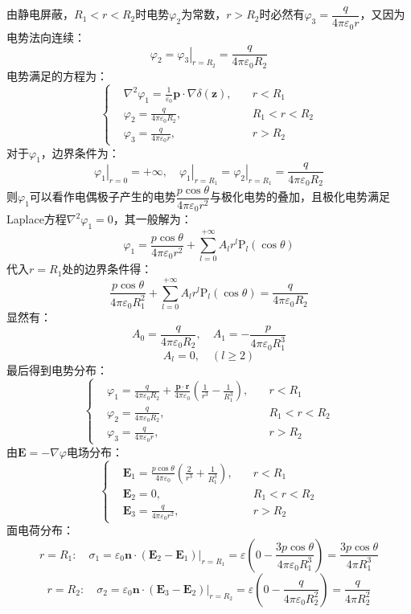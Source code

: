 \documentclass[a4paper,fontset=none]{ctexart}
\begin{document}
\begin{itemize}
        由静电屏蔽，$R_1<r<R_2$时电势$\varphi_2$为常数，$r>R_2$时必然有$\varphi_3=\dfrac{q}{4\pi\varepsilon_0r}$，又因为电势法向连续：
        \[
        \varphi_2 = \left.\varphi_3\right|_{r=R_2} = \frac{q}{4\pi\varepsilon_0R_2}
        \]
        电势满足的方程为：
        \[
        \left\{
            \begin{aligned}
                &\nabla^2\varphi_1 = \frac{1}{\varepsilon_0}\bm{p}\cdot\nabla\delta(\bm{z}),\quad &r<R_1 \\
                &\varphi_2 = \frac{q}{4\pi\varepsilon_0R_2},\quad &R_1<r<R_2 \\
                &\varphi_3 = \frac{q}{4\pi\varepsilon_0r},\quad &r>R_2
            \end{aligned}
        \right.
        \]
        对于$\varphi_1$，边界条件为：
        \[
        \left.\varphi_1\right|_{r=0} = +\infty,\quad
        \left.\varphi_1\right|_{r=R_1} = \left.\varphi_2\right|_{r=R_1} = \frac{q}{4\pi\varepsilon_0R_2}
        \]
        则$\varphi_1$可以看作电偶极子产生的电势$\dfrac{p\cos\theta}{4\pi\varepsilon_0r^2}$与极化电势的叠加，且极化电势满足Laplace方程$\nabla^2\varphi_1=0$，其一般解为：
        \[
        \varphi_1 = \frac{p\cos\theta}{4\pi\varepsilon_0r^2} + \sum_{l=0}^{+\infty}A_l r^l\mathrm{P}_l(\cos\theta)
        \]
        代入$r=R_1$处的边界条件得：
        \[
        \frac{p\cos\theta}{4\pi\varepsilon_0R_1^2} + \sum_{l=0}^{+\infty}A_l r^l\mathrm{P}_l(\cos\theta) = \frac{q}{4\pi\varepsilon_0R_2}
        \]
        显然有：
        \[
        A_0 = \frac{q}{4\pi\varepsilon_0R_2},\quad
        A_1 = -\frac{p}{4\pi\varepsilon_0R_1^3}
        \]
        \[
        A_l = 0,\quad (l\geqslant2)
        \]
        最后得到电势分布：
        \[
        \left\{
            \begin{aligned}
                &\varphi_1 = \frac{q}{4\pi\varepsilon_0R_2} + \frac{\bm{p}\cdot\bm{r}}{4\pi\varepsilon_0}\left(\frac{1}{r^3} - \frac{1}{R_1^3}\right),\quad &r<R_1 \\
                &\varphi_2 = \frac{q}{4\pi\varepsilon_0R_2},\quad &R_1<r<R_2 \\
                &\varphi_3 = \frac{q}{4\pi\varepsilon_0r},\quad &r>R_2
            \end{aligned}
            \right.
        \]
        由$\bm{E}=-\nabla\varphi$电场分布：
        \[
        \left\{
            \begin{aligned}
                &\bm{E}_1 = \frac{p\cos\theta}{4\pi\varepsilon_0}\left(\frac{2}{r^3} + \frac{1}{R_1^3}\right),\quad &r<R_1 \\
                &\bm{E}_2 = 0,\quad &R_1<r<R_2 \\
                &\bm{E}_3 = \frac{q}{4\pi\varepsilon_0r^2},\quad &r>R_2
            \end{aligned}
        \right.
        \]
        面电荷分布：
        \[
        r=R_1:\quad \sigma_1 = \left.\varepsilon_0\bm{n}\cdot(\bm{E}_2 - \bm{E}_1)\right|_{r=R_1} = \varepsilon(0 - \frac{3p\cos\theta}{4\pi\varepsilon_0R_1^3}) = \frac{3p\cos\theta}{4\pi R_1^3}
        \]
        \[
        r=R_2:\quad \sigma_2 = \left.\varepsilon_0\bm{n}\cdot(\bm{E}_3 - \bm{E}_2)\right|_{r=R_2} = \varepsilon(0 - \frac{q}{4\pi\varepsilon_0R_2^2}) = \frac{q}{4\pi R_2^2}
        \]


\end{itemize}
\end{document}
